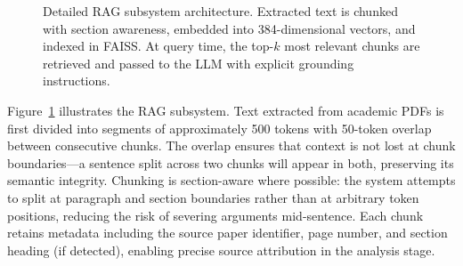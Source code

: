 \documentclass[12pt,a4paper]{article}
\begin{document}
\begin{figure}[htbp]
\centering
{}
\caption{Detailed RAG subsystem architecture. Extracted text is chunked
with section awareness, embedded into 384-dimensional vectors, and indexed
in FAISS. At query time, the top-$k$ most relevant chunks are retrieved
and passed to the LLM with explicit grounding instructions.}
\label{fig:rag}
\end{figure}

Figure~\ref{fig:rag} illustrates the RAG subsystem. Text extracted from academic PDFs is first divided into segments of approximately 500 tokens with 50-token overlap between consecutive chunks. The overlap ensures that context is not lost at chunk boundaries---a sentence split across two chunks will appear in both, preserving its semantic integrity. Chunking is section-aware where possible: the system attempts to split at paragraph and section boundaries rather than at arbitrary token positions, reducing the risk of severing arguments mid-sentence. Each chunk retains metadata including the source paper identifier, page number, and section heading (if detected), enabling precise source attribution in the analysis stage.
\end{document}
